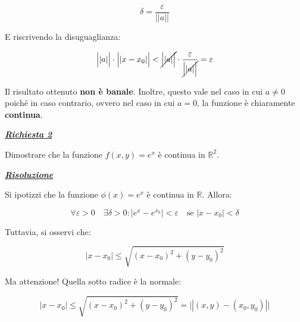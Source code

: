 \documentclass[a4paper]{article}
\begin{document}
	\begin{equation*}
		\delta = \dfrac{\varepsilon}{\Big||a|\Big|}
	\end{equation*}

	\noindent
	E riscrivendo la disuguaglianza:
	
	\begin{equation*}
		\Big||a|\Big| \cdot \Big||x-x_{0}|\Big| < \cancel{\Big||a|\Big|} \cdot \dfrac{\varepsilon}{\cancel{\Big||a|\Big|}} = \varepsilon
	\end{equation*}

	\noindent
	Il risultato ottenuto \textbf{non è banale}. Inoltre, questo vale nel caso in cui $a \ne 0$ poiché in caso contrario, ovvero nel caso in cui $a = 0$, la funzione è chiaramente \textbf{continua}.
	
	\newpage
	
	\noindent
	\textcolor{Red3}{\textbf{\underline{\emph{Richiesta 2}}}}\newline
	
	\noindent
	Dimostrare che la funzione $f\left(x,y\right) = e^{x}$ è continua in $\mathbb{R}^{2}$.\newline
	
	\noindent
	\textcolor{Green4}{\textbf{\underline{\emph{Risoluzione}}}}\newline
	
	\noindent
	Si ipotizzi che la funzione $\phi\left(x\right) = e^{x}$ è continua in $\mathbb{R}$. Allora:
	
	\begin{equation*}
		\forall\varepsilon > 0 \hspace{1em} \exists\delta > 0 : \Big|e^{x} - e^{x_{0}}\Big|<\varepsilon \hspace{1em} \text{se } |x-x_{0}| < \delta
	\end{equation*}

	\noindent
	Tuttavia, si osservi che:
	
	\begin{equation*}
		|x-x_{0}| \le \sqrt{\left(x-x_{0}\right)^{2} + \left(y - y_{0}\right)^{2}}
	\end{equation*}

	\noindent
	Ma attenzione! Quella sotto radice è la normale:
	
	\begin{equation*}
		|x-x_{0}| \le \sqrt{\left(x-x_{0}\right)^{2} + \left(y - y_{0}\right)^{2}} = \Big|\left|\left(x,y\right) - \left(x_{0}, y_{0}\right)\right|\Big|
	\end{equation*}
\end{document}
